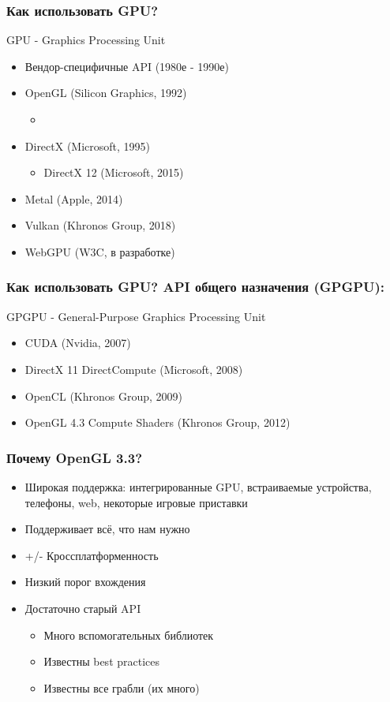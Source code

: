\documentclass{beamer}
\begin{document}
\begin{frame}
\frametitle{Как использовать GPU? }
GPU - Graphics Processing Unit
\pause
\pause
\begin{itemize}
\item Вендор-специфичные API (1980е - 1990е)
\pause
\item OpenGL (Silicon Graphics, 1992)
\pause
\begin{itemize}
\item {}
\end{itemize}
\pause
\item DirectX (Microsoft, 1995)
\pause
\begin{itemize}
\item {DirectX 12 (Microsoft, 2015)}
\end{itemize}
\pause
\item {\only<11->{\color{red}}Metal (Apple, 2014)}
\pause
\item {Vulkan (Khronos Group, 2018)}
\pause
\item {WebGPU (W3C, в разработке)}
\end{itemize}
\end{frame}

\begin{frame}
\frametitle{Как использовать GPU? API общего назначения (GPGPU):}
GPGPU - General-Purpose Graphics Processing Unit
\pause
\begin{itemize}
\item CUDA (Nvidia, 2007)
\pause
\item DirectX 11 DirectCompute (Microsoft, 2008)
\pause
\item OpenCL (Khronos Group, 2009)
\pause
\item OpenGL 4.3 Compute Shaders (Khronos Group, 2012)
\end{itemize}
\end{frame}

\begin{frame}
\frametitle{Почему OpenGL 3.3?}
\pause
\begin{itemize}
\item Широкая поддержка: интегрированные GPU, встраиваемые устройства, телефоны, web, некоторые игровые приставки
\pause
\item Поддерживает всё, что нам нужно
\pause
\item +/- Кроссплатформенность
\pause
\item Низкий порог вхождения
\pause
\item Достаточно старый API
\begin{itemize}
\item Много вспомогательных библиотек
\item Известны best practices
\item Известны все грабли \pause (их много)
\end{itemize}
\end{itemize}
\end{frame}
\end{document}
